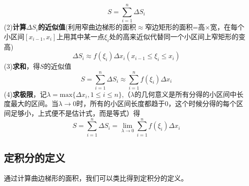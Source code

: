 \begin{equation}
	S=\sum_{i=1}^{n}\Delta S_i
\end{equation}
\hspace*{2em} (2)\textbf{计算$\Delta S_i$的近似值}(利用窄曲边梯形的面积$\approx$窄边矩形的面积=高$\times$宽，在每个小区间$[x_{i-1},x_i]$上用其中某一点$\xi_i$处的高来近似代替同一个小区间上窄矩形的变高)
\begin{equation}
	\Delta S_i\approx f(\xi_i)\Delta x_i(x_{i-1}\leq \xi_i\leq x_i)
\end{equation}
\hspace*{2em} (3)\textbf{求和}，得$S$的近似值
\begin{equation}
	S=\sum_{i=1}^{n}\Delta S_i\approx\sum_{i=1}^{n} f(\xi_i)\Delta x_i
\end{equation}
\hspace*{2em} (4)\textbf{求极限}，记$\lambda=\text{max}\{\Delta x_i,1\leq i\leq n\}$,（$\lambda$的几何意义是所有分得的小区间中长度最大的区间。当$\lambda\to0$时，所有的小区间长度都趋于0，这个时候分得的每个区间足够小，上式便不是估计式，而是等式）得
\begin{equation}
	S=\sum_{i=1}^{n}\Delta S_i=\lim\limits_{\lambda\to 0}\sum_{i=1}^{n}f(\xi_i)\Delta x_i
\end{equation}
\subsection{定积分的定义}
通过计算曲边梯形的面积，我们可以类比得到定积分的定义。
\\ 

